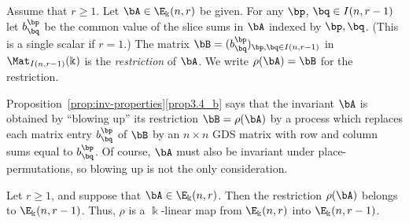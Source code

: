 \begin{defi}\label{def:restr}
 Assume that $r \ge 1$. Let $\bA \in \E_\Bbbk(n,r)$ be given. For
 any $\bp$, $\bq \in I(n,r-1)$ let $b^\bp_\bq$ be the common value of
 the slice sums in $\bA$ indexed by $\bp, \bq$. (This is a single
 scalar if $r=1$.) The matrix $\bB = (b^\bp_\bq)_{\bp,\bq \in
 I(n,r-1)}$ in $\Mat_{I(n,r-1)}(\Bbbk)$ is the \emph{restriction}
 of $\bA$. We write $\rho(\bA) = \bB$ for the restriction.
\end{defi}

Proposition~\ref{prop:inv-properties}\ref{prop3.4_b} says that the invariant
$\bA$ is obtained by ``blowing up'' its restriction $\bB = \rho(\bA)$
by a process which replaces each matrix entry $b^\bp_\bq$ of $\bB$ by
an $n \times n$ GDS matrix with row and column sums equal to
$b^\bp_\bq$. Of course, $\bA$ must also be invariant under
place-permutations, so blowing up is not the only consideration.

\begin{prop}\label{prop:restr-is-invariant}
 Let $r \ge 1$, and suppose that $\bA \in \E_\Bbbk(n,r)$. Then the
 restriction $\rho(\bA)$ belongs to $\E_\Bbbk(n,r-1)$. Thus, $\rho$
 is a $\Bbbk$-linear map from $\E_\Bbbk(n,r)$ into $\E_\Bbbk(n,r-1)$.
\end{prop}

